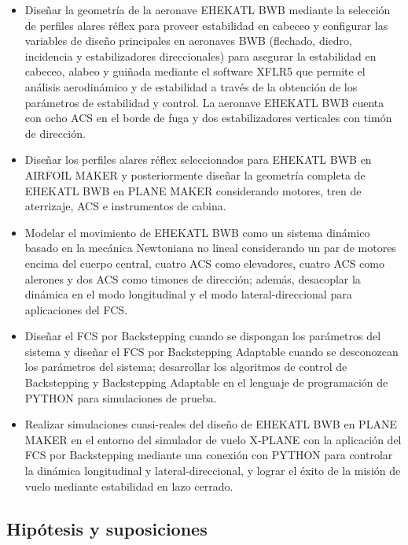 \begin{itemize}
\item[O1] Diseñar la geometría de la aeronave EHEKATL BWB mediante la selección de perfiles alares réflex para proveer estabilidad en cabeceo y configurar las variables de diseño principales en aeronaves BWB (flechado, diedro, incidencia y estabilizadores direccionales) para asegurar la estabilidad en cabeceo, alabeo y guiñada mediante el software XFLR5 que permite el análisis aerodinámico y de estabilidad a través de la obtención de los parámetros de estabilidad y control. La aeronave EHEKATL BWB cuenta con ocho ACS en el borde de fuga y dos estabilizadores verticales con timón de dirección.  
\item[O2]  Diseñar los perfiles alares réflex seleccionados para EHEKATL BWB en AIRFOIL MAKER y posteriormente diseñar la geometría completa de EHEKATL BWB en PLANE MAKER considerando motores, tren de aterrizaje, ACS e instrumentos de cabina. 
\item[O3] Modelar el movimiento de EHEKATL BWB como un sistema dinámico basado en la mecánica Newtoniana no lineal considerando un par de motores encima del cuerpo central, cuatro ACS como elevadores, cuatro ACS como alerones y dos ACS como timones de dirección; además, desacoplar la dinámica en el modo longitudinal y el modo lateral-direccional para aplicaciones del FCS. 
\item[O4] Diseñar el FCS por Backstepping cuando se dispongan los parámetros del sistema y diseñar el FCS por Backstepping Adaptable cuando se desconozcan los parámetros del sistema; desarrollar los algoritmos de control de Backstepping y Backstepping Adaptable en el lenguaje de programación de PYTHON para simulaciones de prueba. 
\item[O5] Realizar simulaciones cuasi-reales del diseño de EHEKATL BWB en PLANE MAKER en el entorno del simulador de vuelo X-PLANE con la aplicación del FCS por Backstepping mediante una conexión con PYTHON para controlar la dinámica longitudinal y lateral-direccional, y lograr el éxito de la misión de vuelo mediante estabilidad en lazo cerrado. 
\end{itemize}

\subsection{Hipótesis y suposiciones}

